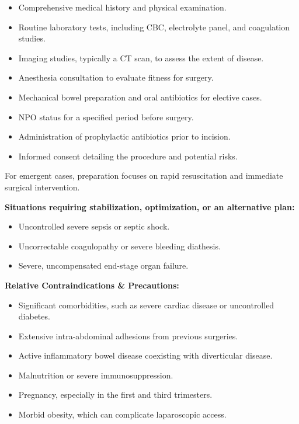 \begin{itemize}
  \item Comprehensive medical history and physical examination.
  \item Routine laboratory tests, including CBC, electrolyte panel, and coagulation studies.
  \item Imaging studies, typically a CT scan, to assess the extent of disease.
  \item Anesthesia consultation to evaluate fitness for surgery.
  \item Mechanical bowel preparation and oral antibiotics for elective cases.
  \item NPO status for a specified period before surgery.
  \item Administration of prophylactic antibiotics prior to incision.
  \item Informed consent detailing the procedure and potential risks.
\end{itemize}

For emergent cases, preparation focuses on rapid resuscitation and immediate surgical intervention.

\textbf{Situations requiring stabilization, optimization, or an alternative plan:}

\begin{itemize}
  \item Uncontrolled severe sepsis or septic shock.
  \item Uncorrectable coagulopathy or severe bleeding diathesis.
  \item Severe, uncompensated end-stage organ failure.
\end{itemize}

\textbf{Relative Contraindications \& Precautions:}

\begin{itemize}
  \item Significant comorbidities, such as severe cardiac disease or uncontrolled diabetes.
  \item Extensive intra-abdominal adhesions from previous surgeries.
  \item Active inflammatory bowel disease coexisting with diverticular disease.
  \item Malnutrition or severe immunosuppression.
  \item Pregnancy, especially in the first and third trimesters.
  \item Morbid obesity, which can complicate laparoscopic access.
\end{itemize}

